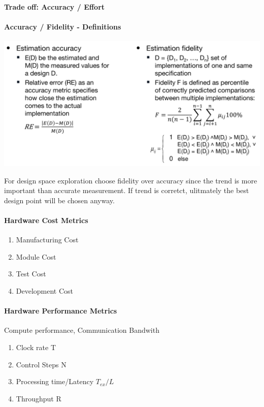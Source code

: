 \documentclass[english]{latex4ei/latex4ei_sheet}
\begin{document}
\paragraph{Trade off: Accuracy / Effort}


\paragraph{Accuracy / Fidelity - Definitions}
\begin{center}
  \includegraphics[width=\linewidth]{assets/AccuracyFidelityDefinitions.png}
  \label{fig:accuracyfidelitydefinitions}
\end{center}

For design space exploration choose fidelity over accuracy since the trend is more important than accurate measurement. If trend is corretct, ulitmately the best design point will be chosen anyway.

\paragraph{Hardware Cost Metrics}
\begin{enumerate}
	\item Manufacturing Cost
	\item Module Cost
	\item Test Cost
	\item Development Cost
\end{enumerate}

\paragraph{Hardware Performance Metrics}
Compute performance, Communication Bandwith
\begin{enumerate}
  \item Clock rate T
  \item Control Steps N
  \item Processing time/Latency $T_{ex} / L$
  \item Throughput R
\end{enumerate}
 
\end{document}
